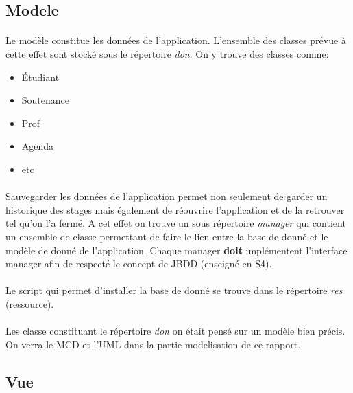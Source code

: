 \documentclass[a4paper,10pt]{report}
\begin{document}
		\subsection{Modele}

			\paragraph*{}
			Le modèle constitue les données de l’application. L’ensemble des classes prévue à cette effet sont stocké sous le répertoire \textit{don}. On y trouve des classes comme:
			\begin{itemize}
				\item Étudiant
				\item Soutenance
				\item Prof
				\item Agenda
				\item etc
			\end{itemize} 

			\paragraph*{}
			Sauvegarder les données de l'application permet non seulement de garder un historique des stages mais également de réouvrire l'application et de la retrouver tel qu'on l'a fermé. A cet effet on trouve un sous répertoire \textit{manager} qui contient un ensemble de classe permettant de faire le lien entre la base de donné et le modèle de donné de l'application. Chaque manager \textbf{doit} implémentent l'interface manager afin de respecté le concept de JBDD (enseigné en S4).

		\paragraph*{}
		Le script qui permet d'installer la base de donné se trouve dans le répertoire \textit{res} (ressource).

			\paragraph*{}
			Les classe constituant le répertoire \textit{don} on était pensé sur un modèle bien précis. On verra le MCD et l'UML dans la partie modelisation de ce rapport.

		\subsection{Vue}
\end{document}
